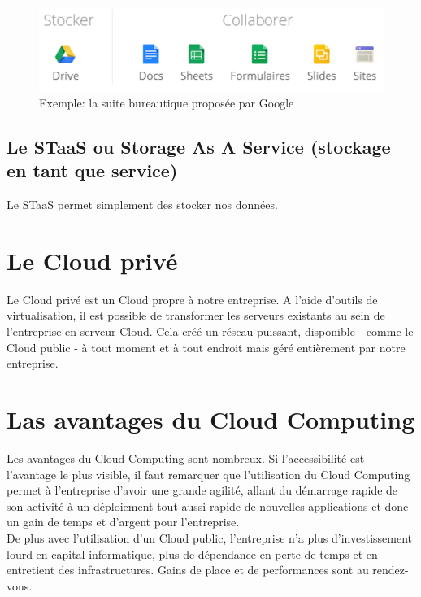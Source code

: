     \begin{figure}
      \begin{center}
        \includegraphics[scale=0.5]{images/googleDrive.png}
      \end{center}
      \caption{Exemple: la suite bureautique proposée par Google}
      \label{Google Cloud}
    \end{figure}

    \subsection{Le STaaS ou Storage As A Service (stockage en tant que service)}
    Le STaaS permet simplement des stocker nos données.

  \section{Le Cloud privé}
  Le Cloud privé est un Cloud propre à notre entreprise. A l’aide d’outils de virtualisation, il est possible de transformer les serveurs existants au sein de l’entreprise en serveur Cloud. Cela créé un réseau puissant, disponible - comme le Cloud public - à tout moment et à tout endroit mais géré entièrement par notre entreprise.

  \section{Las avantages du Cloud Computing}
  Les avantages du Cloud Computing sont nombreux. Si l’accessibilité est l’avantage le plus visible, il faut remarquer que l’utilisation du Cloud Computing permet à l’entreprise d’avoir une grande agilité, allant du démarrage rapide de son activité à un déploiement tout aussi rapide de nouvelles applications et donc un gain de temps et d’argent pour l’entreprise.\\

  De plus avec l’utilisation d’un Cloud public, l’entreprise n’a plus d’investissement lourd en capital informatique, plus de dépendance en perte de temps et en entretient des infrastructures. Gains de place et de performances sont au rendez-vous.\\

